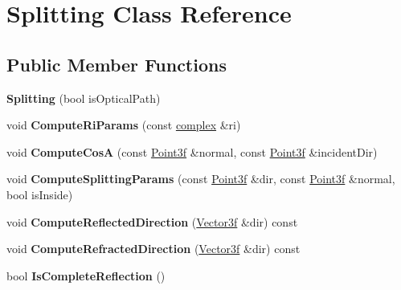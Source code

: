 \hypertarget{class_splitting}{}\section{Splitting Class Reference}
\label{class_splitting}
\subsection*{Public Member Functions}
\begin{DoxyCompactItemize}
\item 
\mbox{\label{class_splitting_ae61861068fc3fb2657c68031a15fb439}} 
{\bfseries Splitting} (bool is\+Optical\+Path)
\item 
\mbox{\label{class_splitting_adfbb1ab8127f051f4611cabd17d97bdf}} 
void {\bfseries Compute\+Ri\+Params} (const \mbox{\hyperlink{classcomplex}{complex}} \&ri)
\item 
\mbox{\label{class_splitting_a50548588926ef8d4087d9a584ef54a52}} 
void {\bfseries Compute\+CosA} (const \mbox{\hyperlink{struct_point3f}{Point3f}} \&normal, const \mbox{\hyperlink{struct_point3f}{Point3f}} \&incident\+Dir)
\item 
\mbox{\label{class_splitting_ae182dc1715fc739dba78c3c97a1810ed}} 
void {\bfseries Compute\+Splitting\+Params} (const \mbox{\hyperlink{struct_point3f}{Point3f}} \&dir, const \mbox{\hyperlink{struct_point3f}{Point3f}} \&normal, bool is\+Inside)
\item 
\mbox{\label{class_splitting_a3842400b405dc510ec0828749c87f19a}} 
void {\bfseries Compute\+Reflected\+Direction} (\mbox{\hyperlink{struct_point3f}{Vector3f}} \&dir) const
\item 
\mbox{\label{class_splitting_a3aac5abb798e891b1481fd51b53b9764}} 
void {\bfseries Compute\+Refracted\+Direction} (\mbox{\hyperlink{struct_point3f}{Vector3f}} \&dir) const
\item 
\mbox{\label{class_splitting_ade6dcabafb5518d3b552a88d40568151}} 
bool {\bfseries Is\+Complete\+Reflection} ()
\item 
\mbox{\label{class_splitting_a3cfc6576a259bc89c09bc0a5af57f4a0}} 

\end{DoxyCompactItemize}
